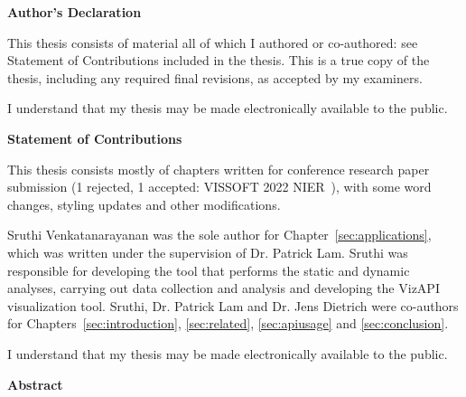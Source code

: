 \cleardoublepage %

\begin{center}\textbf{Author's Declaration}\end{center}
  \noindent
This thesis consists of material all of which I authored or co-authored: see Statement of Contributions included in the thesis. This is a true copy of the thesis, including any required final revisions, as accepted by my examiners.

  \bigskip
  
  \noindent
I understand that my thesis may be made electronically available to the public.

\cleardoublepage

\begin{center}\textbf{Statement of Contributions}\end{center}
   \noindent
This thesis consists mostly of chapters written for conference research paper submission
(1 rejected, 1 accepted: VISSOFT 2022 NIER~\cite{venkatanarayananvizapi}), with some word changes, styling updates and other modifications.

Sruthi Venkatanarayanan was the sole author for Chapter~\ref{sec:applications}, which was written under the
supervision of Dr. Patrick Lam. Sruthi was responsible for developing the tool that performs the static and dynamic analyses, 
carrying out data collection and analysis and developing the VizAPI visualization tool.
Sruthi, Dr. Patrick Lam and Dr. Jens Dietrich were co-authors for Chapters~\ref{sec:introduction}, \ref{sec:related}, \ref{sec:apiusage} and \ref{sec:conclusion}.
  \bigskip
  
  \noindent
I understand that my thesis may be made electronically available to the public.

\cleardoublepage



\begin{center}\textbf{Abstract}\end{center}


